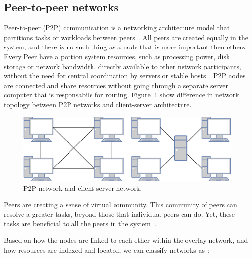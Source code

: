 \subsection{Peer-to-peer networks}\label{sec:p2p_networks}
%
Peer-to-peer (P2P) communication is a networking architecture model that partitions tasks or workloads between peers~\cite{Schollmeier01}. All peers are created equally in the system, and there is no such thing as a node that is more important then others. Every Peer have a portion system resources, such as processing power, disk storage or network bandwidth, directly available to other network participants, without the need for central coordination by servers or stable hosts~\cite{Schollmeier01}. P2P nodes are connected and share resources without going through a separate server computer that is responsabile for routing. Figure~\ref{fig:fig2} show difference in network topology between P2P networks and client-server architecture.

\begin{figure}[H]
	\begin{center}
		\includegraphics[scale=0.7]{images/Figure2.png}
	\end{center}
	\vspace{-0.6cm}
	\caption{P2P network and client-server network.}
	\label{fig:fig2}
\end{figure}

Peers are creating a sense of virtual community. This community of peers can resolve a greater tasks, beyond those that individual peers can do. Yet, these tasks are beneficial to all the peers in the system~\cite{BandaraJ13}.

Based on how the nodes are linked to each other within the overlay network, and how resources are indexed and located, we can classify networks as~\cite{KamelSE07}:

